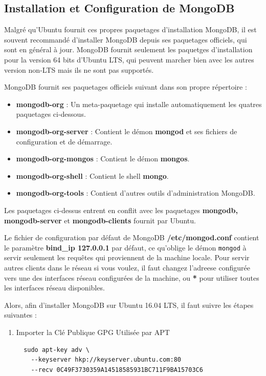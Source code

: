 \documentclass[a4paper,11pt,oneside]{report}
\begin{document}
\begin{appendices}
\newpage

\section{Installation et Configuration de MongoDB}
Malgré qu'Ubuntu fournit ces propres paquetages d'installation MongoDB, il est souvent recommandé d'installer MongoDB depuis ses paquetages officiels, qui sont en général à jour. MongoDB fournit seulement les paquetges d'installation pour la version 64 bits d'Ubuntu LTS, qui peuvent marcher bien avec les autres version non-LTS mais ils ne sont pas supportés.
\newline

MongoDB fournit ses paquetages officiels suivant dans son propre répertoire :
\begin{itemize}
  \item{\textbf{mongodb-org} : Un meta-paquetage qui installe automatiquement les quatres paquetages ci-dessous.} 
  \item{\textbf{mongodb-org-server} : Contient le démon \textbf{mongod} et ses fichiers de configuration et de démarrage.} 
  \item{\textbf{mongodb-org-mongos} : Contient le démon \textbf{mongos}.} 
  \item{\textbf{mongodb-org-shell} : Contient le shell \textbf{mongo}.} 
  \item{\textbf{mongodb-org-tools} : Contient d'autres outils d'administration MongoDB.} 
  \newline
\end{itemize}


Les paquetages ci-dessus entrent en conflit avec les paquetages \textbf{mongodb, mongodb-server} et \textbf{mongodb-clients} fournit par Ubuntu. 
\newline

Le fichier de configuration par défaut de MongoDB \textbf{/etc/mongod.conf} contient le paramètre \textbf{bind\_ip 127.0.0.1} par défaut, ce qu'oblige le démon \texttt{mongod} à servir seulement les requêtes qui proviennent de la machine locale. Pour servir autres clients dans le réseau si vous voulez, il faut changez l'adreese configurée vers une des interfaces réseau configurées de la machine, ou \textbf{*} pour utiliser toutes les interfaces réseau disponibles.
\newline

Alors, afin d'installer MongoDB sur Ubuntu 16.04 LTS, il faut suivre les étapes suivantes :
\begin{enumerate}
  \item{Importer la Clé Publique GPG Utilisée par APT}
  \begin{verbatim}
  sudo apt-key adv \
    --keyserver hkp://keyserver.ubuntu.com:80 
    --recv 0C49F3730359A14518585931BC711F9BA15703C6
  \end{verbatim}


\end{enumerate}
\end{appendices}
\end{document}
